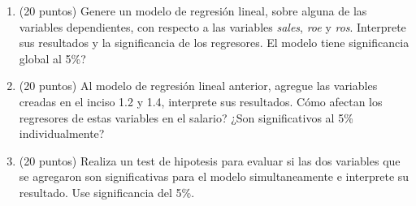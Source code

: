 \documentclass[letterpaper,11pt]{article}
\begin{document}
\begin{enumerate}

    \item (20 puntos) Genere un modelo de regresión lineal, sobre alguna de las variables dependientes, con respecto a las variables \textit{sales}, \textit{roe} y \textit{ros}. Interprete sus resultados y la significancia de los regresores. \textquestiondown El modelo tiene significancia global al 5\%?



\item (20 puntos) Al modelo de regresión lineal anterior, agregue las variables creadas en el inciso 1.2 y 1.4, interprete sus resultados. \textquestiondown Cómo afectan los regresores de estas variables en el salario? ¿Son significativos al 5\% individualmente?



\item (20 puntos) Realiza un test de hipotesis para evaluar si las dos variables que se agregaron son significativas para el modelo simultaneamente e interprete su resultado. Use significancia del 5\%.


\end{enumerate}
\end{document}
